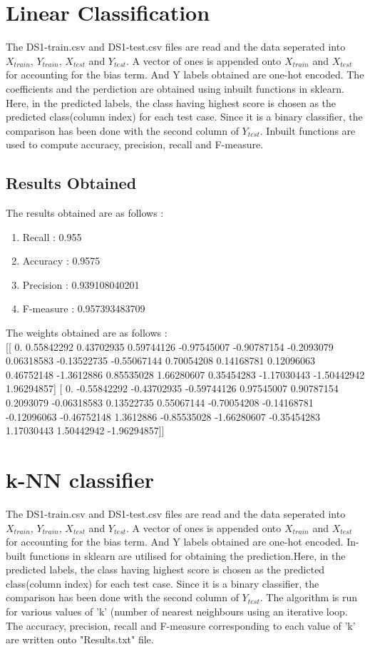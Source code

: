 \documentclass[paper=a4, fontsize=11pt]{scrartcl}
\numberwithin{equation}{section}		%
\numberwithin{figure}{section}			%
\numberwithin{table}{section}				%
\begin{document}
\section{Linear Classification}

The DS1-train.csv and DS1-test.csv files are read and the data seperated into $X_{train}$, $Y_{train}$, $X_{test}$ and $Y_{test}$. A vector of ones is appended onto $X_{train}$ and $X_{test}$ for accounting for the bias term. And Y labels obtained are one-hot encoded. The coefficients and the perdiction are obtained using inbuilt functions in sklearn. Here, in the predicted labels, the class having highest score is chosen as the predicted class(column index) for each test case. Since it is a binary classifier, the comparison has been done with the second column of $Y_{test}$. Inbuilt functions are used to compute accuracy, precision, recall and F-measure.
 
\subsection{Results Obtained}
The results obtained are as follows :
\begin{enumerate}
	\item Recall : 0.955
	\item Accuracy : 0.9575
	\item Precision : 0.939108040201
	\item F-measure : 0.957393483709
\end{enumerate}

The weights obtained are as follows :\\

[[ 0.          0.55842292  0.43702935  0.59744126 -0.97545007 -0.90787154
  -0.2093079   0.06318583 -0.13522735 -0.55067144  0.70054208  0.14168781
   0.12096063  0.46752148 -1.3612886   0.85535028  1.66280607  0.35454283
  -1.17030443 -1.50442942  1.96294857]
 [ 0.         -0.55842292 -0.43702935 -0.59744126  0.97545007  0.90787154
   0.2093079  -0.06318583  0.13522735  0.55067144 -0.70054208 -0.14168781
  -0.12096063 -0.46752148  1.3612886  -0.85535028 -1.66280607 -0.35454283
   1.17030443  1.50442942 -1.96294857]] 

\section{k-NN classifier}
The DS1-train.csv and DS1-test.csv files are read and the data seperated into $X_{train}$, $Y_{train}$, $X_{test}$ and $Y_{test}$. A vector of ones is appended onto $X_{train}$ and $X_{test}$ for accounting for the bias term. And Y labels obtained are one-hot encoded. In-built functions in sklearn are utilised for obtaining the prediction.Here, in the predicted labels, the class having highest score is chosen as the predicted class(column index) for each test case. Since it is a binary classifier, the comparison has been done with the second column of $Y_{test}$. The algorithm is run for various values of 'k' (number of nearest neighbours using an iterative loop. The accuracy, precision, recall and F-measure corresponding to each value of 'k' are written onto "Results.txt" file. 
\end{document}
